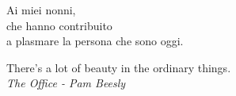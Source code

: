 \cleardoublepage
    \thispagestyle{empty}
		{\large
            \begin{flushright}
				Ai miei nonni,\\
				che hanno contribuito\\
				a plasmare la persona che sono oggi.
				\vspace{2em}

				There's a lot of beauty in the ordinary things.\\
				\textit{The Office - Pam Beesly}

            \end{flushright}
		}
\cleardoublepage